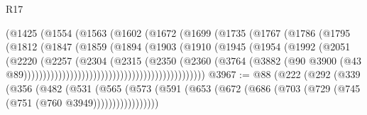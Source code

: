 \begin{lexlean}{R17}
\begin{coremodule}
                                      (@1425
                                        (@1554
                                          (@1563
                                            (@1602
                                              (@1672
                                                (@1699
                                                  (@1735
                                                    (@1767
                                                      (@1786
                                                        (@1795
                                                          (@1812
                                                            (@1847
                                                              (@1859
                                                                (@1894
                                                                  (@1903
                                                                    (@1910
                                                                      (@1945
                                                                        (@1954
                                                                          (@1992
                                                                            (@2051
                                                                              (@2220
                                                                                (@2257
                                                                                  (@2304
                                                                                    (@2315
                                                                                      (@2350
                                                                                        (@2360
                                                                                          (@3764
                                                                                            (@3882
                                                                                              (@90
                                                                                                @3900
                                                                                                (@43
                                                                                                  @89)))))))))))))))))))))))))))))))))))))))))))))))
@3967 := @88
    (@222
      (@292
        (@339
          (@356
            (@482
              (@531
                (@565
                  (@573 (@591 (@653 (@672 (@686 (@703 (@729 (@745 (@751 (@760 @3949)))))))))))))))))

\end{coremodule}
\end{lexlean}
